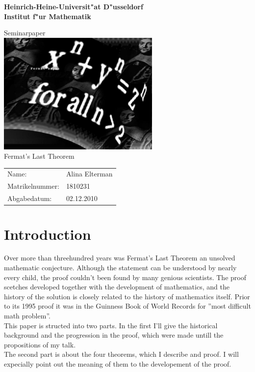 \documentclass[12pt, a4paper, twoside]{article}
\numberwithin{equation}{section}
\begin{document}
\begin{titlepage}
\begin{center}
\vspace{1em}
\textbf{
\Large Heinrich-Heine-Universit"at D"usseldorf\\
\smallskip
\Large Institut f"ur Mathematik\\
\smallskip}

\vspace{3em}
{\Huge Seminarpaper\\}
\vspace{3em}
\includegraphics[height=6cm]{a.jpg}\\
\vspace{4em} {\Huge Fermat's Last Theorem}
\end{center}

\vfill

\begin{center}
{\large
\begin{tabular}[l]{ll}
Name: & Alina Elterman\\
Matrikelnummer: & 1810231\\
Abgabedatum: & 02.12.2010
\end{tabular}
}
\end{center}
\end{titlepage}
\newpage
\thispagestyle{empty}
\tableofcontents
\newpage
\thispagestyle{empty}
\listoffigures
\newpage
{}
\setcounter{page}{1}
\section{Introduction}
Over more than threehundred years was Fermat's Last Theorem an unsolved mathematic conjecture. Although the statement can be understood by nearly every child, the proof couldn't been found by many genious scientists. The proof scetches developed together with the development of mathematics, and the history of the solution is closely related to the history of mathematics itself. Prior to its 1995 proof it was in the Guinness Book of World Records for ''most difficult math problem''.\\
This paper is structed into two parts. In the first I'll give the historical background and the progression in the proof, which were made untill the propositions of my talk.\\
The second part is about the four theorems, which I describe and proof. I will expecially point out the meaning of them to the developement of the proof.
\end{document}
